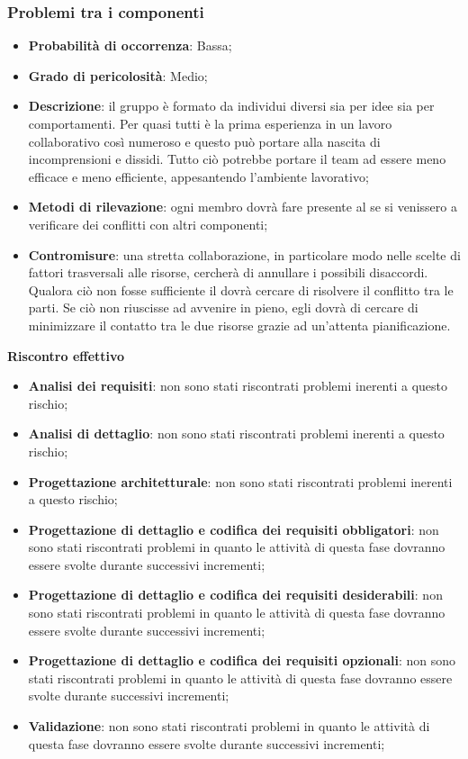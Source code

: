 		\subsubsection{Problemi tra i componenti} %
		\label{ssub:problemi_tra_i_componenti}
			\begin{itemize}
				\item \textbf{Probabilità di occorrenza}: Bassa;
				\item \textbf{Grado di pericolosità}: Medio;
				\item \textbf{Descrizione}: il gruppo è formato da individui diversi sia per idee sia per comportamenti. Per quasi tutti è la prima esperienza in un lavoro collaborativo così numeroso e questo può portare alla nascita di incomprensioni e dissidi. Tutto ciò potrebbe portare il team ad essere meno efficace e meno efficiente, appesantendo l'ambiente lavorativo;
				\item \textbf{Metodi di rilevazione}: ogni membro dovrà fare presente al \roleProjectManager{} se si venissero a verificare dei conflitti con altri componenti;
				\item \textbf{Contromisure}: una stretta collaborazione, in particolare modo nelle scelte di fattori trasversali alle risorse, cercherà di annullare i possibili disaccordi. \newline
				Qualora ciò non fosse sufficiente il \roleProjectManager{} dovrà cercare di risolvere il conflitto tra le parti. Se ciò non riuscisse ad avvenire in pieno, egli dovrà di cercare di minimizzare il contatto tra le due risorse grazie ad un'attenta pianificazione. \newline
			\end{itemize}
		\noindent
		\textbf{Riscontro effettivo}
			\begin{itemize}
				\item \textbf{Analisi dei requisiti}: non sono stati riscontrati problemi inerenti a questo rischio;
				\item \textbf{Analisi di dettaglio}: non sono stati riscontrati problemi inerenti a questo rischio;
				\item \textbf{Progettazione architetturale}: non sono stati riscontrati problemi inerenti a questo rischio;
				\item \textbf{Progettazione di dettaglio e codifica dei requisiti obbligatori}: non sono stati riscontrati problemi in quanto le attività di questa fase dovranno essere svolte durante successivi incrementi;
				\item \textbf{Progettazione di dettaglio e codifica dei requisiti desiderabili}: non sono stati riscontrati problemi in quanto le attività di questa fase dovranno essere svolte durante successivi incrementi;
				\item \textbf{Progettazione di dettaglio e codifica dei requisiti opzionali}: non sono stati riscontrati problemi in quanto le attività di questa fase dovranno essere svolte durante successivi incrementi;
				\item \textbf{Validazione}: non sono stati riscontrati problemi in quanto le attività di questa fase dovranno essere svolte durante successivi incrementi;
			\end{itemize}


